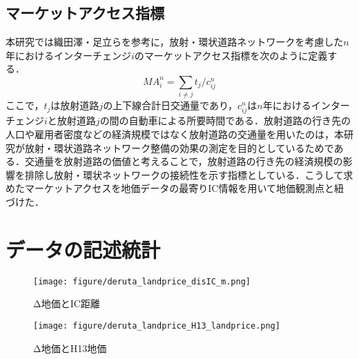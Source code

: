 \subsection{マーケットアクセス指標}
本研究では織田澤・足立らを参考に，放射・環状道路ネットワークを考慮した$n$年におけるインターチェンジ$i$のマーケットアクセス指標を次のように定義する．
\[{MA}^{n}_{i} = \sum_{i \neq j}{t_{j}/c^{n}_{ij}}\]
ここで，$t_{j}$は放射道路$j$の上下線合計日交通量であり，$c^{n}_{ij}$は$n$年におけるインターチェンジ$i$と放射道路$j$の間の自動車による所要時間である．放射道路の行き先の人口や雇用者密度などの経済規模ではなく放射道路の交通量を用いたのは，本研究が放射・環状道路ネットワーク整備の効果の測定を目的としているためである．交通量を放射道路の価値と考えることで，放射道路の行き先の経済規模の影響を排除し放射・環状ネットワークの接続性を示す指標としている．こうして求めたマーケットアクセスを地価データの最寄りIC情報を用いて地価観測点と紐づけた．

\section{データの記述統計}
\begin{figure}[H]
  \centering
  \texttt{[image: figure/deruta\_landprice\_disIC\_m.png]}
  \caption{Δ地価とIC距離}
  \label{deruta_landprice disIC_m}
\end{figure}

\begin{figure}[H]
  \centering
  \texttt{[image: figure/deruta\_landprice\_H13\_landprice.png]}
  \caption{Δ地価とH13地価}
  \label{deruta_landprice_H13_landprice}
\end{figure}






